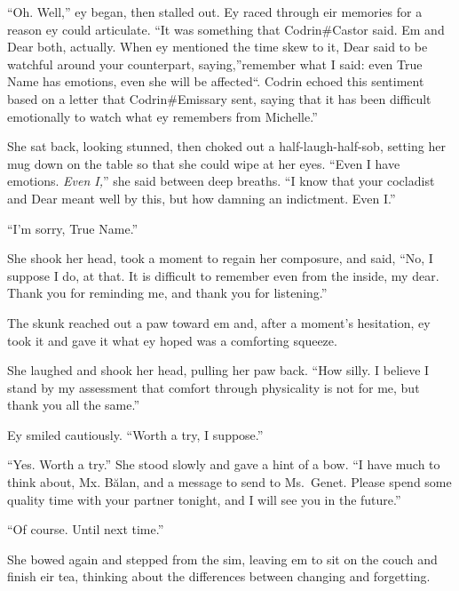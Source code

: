 ``Oh. Well,'' ey began, then stalled out. Ey raced through eir memories for a reason ey could articulate. ``It was something that Codrin\#Castor said. Em and Dear both, actually. When ey mentioned the time skew to it, Dear said to be watchful around your counterpart, saying,''remember what I said: even True Name has emotions, even she will be affected``. Codrin echoed this sentiment based on a letter that Codrin\#Emissary sent, saying that it has been difficult emotionally to watch what ey remembers from Michelle.''

She sat back, looking stunned, then choked out a half-laugh-half-sob, setting her mug down on the table so that she could wipe at her eyes. ``Even I have emotions. \emph{Even I,}'' she said between deep breaths. ``I know that your cocladist and Dear meant well by this, but how damning an indictment. Even I.''

``I'm sorry, True Name.''

She shook her head, took a moment to regain her composure, and said, ``No, I suppose I do, at that. It is difficult to remember even from the inside, my dear. Thank you for reminding me, and thank you for listening.''

The skunk reached out a paw toward em and, after a moment's hesitation, ey took it and gave it what ey hoped was a comforting squeeze.

She laughed and shook her head, pulling her paw back. ``How silly. I believe I stand by my assessment that comfort through physicality is not for me, but thank you all the same.''

Ey smiled cautiously. ``Worth a try, I suppose.''

``Yes. Worth a try.'' She stood slowly and gave a hint of a bow. ``I have much to think about, Mx. Bălan, and a message to send to Ms.~Genet. Please spend some quality time with your partner tonight, and I will see you in the future.''

``Of course. Until next time.''

She bowed again and stepped from the sim, leaving em to sit on the couch and finish eir tea, thinking about the differences between changing and forgetting.
